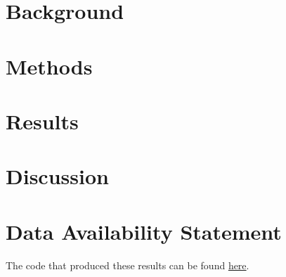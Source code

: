 \documentclass{article}
\numberwithin{equation}{section}
\theoremstyle{plain}
\begin{document}
\section{Background}

\section{Methods}

\section{Results}

\section{Discussion}

\section{Data Availability Statement}
The code that produced these results can be found \href{https://github.com/johnargentino/remarcs_methodological}{here}.


% 
\end{document}
